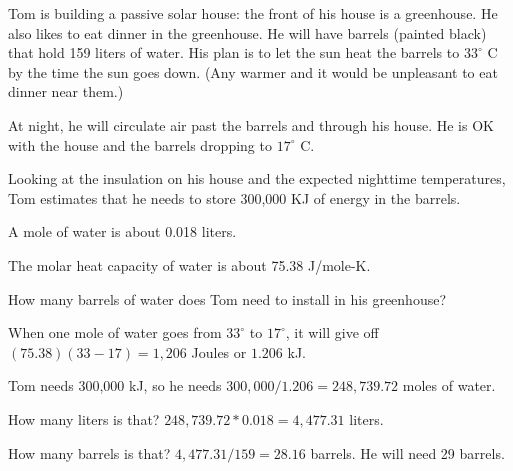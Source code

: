 \begin{Exercise}[title=Using Water For Thermal Energy Storage, label=waterthermal]
Tom is building a passive solar house:  the front of his house is a greenhouse.  He also likes to 
eat dinner in the greenhouse.  He will have barrels (painted black) that hold 159 liters of water.  His plan is to let the sun heat the barrels to $33^\circ$ C by the time the sun goes down.  (Any warmer and it would be unpleasant to eat dinner near them.)

At night, he will circulate air past the barrels and through his house.  He is OK with the house and the barrels dropping to $17^\circ$ C.

Looking at the insulation on his house and the expected nighttime temperatures,  Tom estimates that he needs to store 300,000 KJ of energy in the barrels.

A mole of water is about 0.018 liters.

The molar heat capacity of water is about 75.38 J/mole-K.

How many barrels of water does Tom need to install in his greenhouse?

\end{Exercise}
\begin{Answer}[ref=waterthermal] 

When one mole of water goes from $33^\circ$ to $17^\circ$,  it will give off $(75.38)(33-17) = 1,206$ Joules or $1.206$ kJ. 

Tom needs 300,000 kJ,  so he needs $300,000/1.206 =   248,739.72$ moles of water.

How many liters is that?  $248,739.72 * 0.018 = 4,477.31$ liters.

How many barrels is that? $4,477.31 / 159 = 28.16$ barrels.  He will need 29 barrels.
  
\end{Answer}


